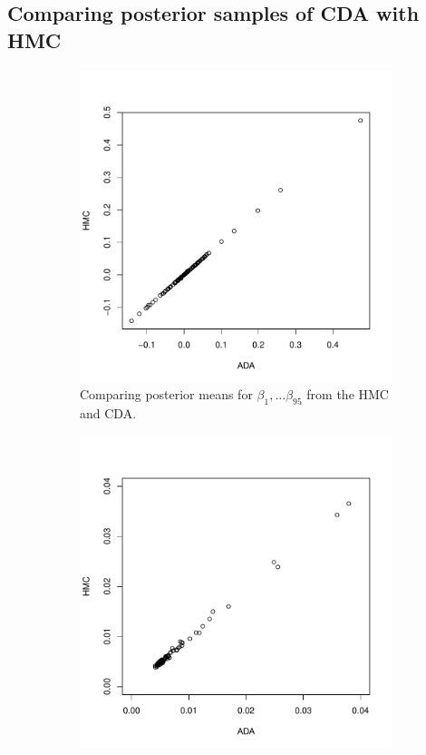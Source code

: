 \documentclass[10pt]{article}
\begin{document}
 \subsection{Comparing posterior samples of CDA with HMC}


\begin{figure}[H]
   \begin{subfigure}[b]{0.45\textwidth}
 \includegraphics[width=1\textwidth]{CDAvsHMC_mean.pdf}
 \caption{Comparing posterior means for $\beta_1,\dots \beta_{95}$ from the HMC and CDA.}
 \end{subfigure}
  \hfill 
 \begin{subfigure}[b]{0.45\textwidth}
 \includegraphics[width=1\textwidth]{CDAvsHMC_sd.pdf}

\end{subfigure}
\end{figure}
\end{document}

